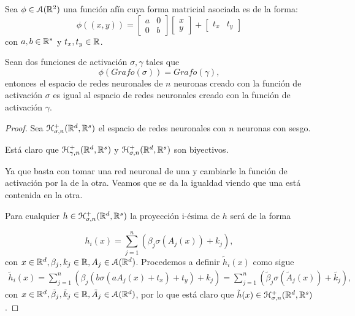 \begin{aportacionOriginal}

\begin{teorema}\label{teo:eficacia-funciones-activation}
    \label{teo:equivalencia-grafos-activation-function}
    Sea $\phi \in \mathcal{A}(\mathbb{R}^2)$ una función afín 
    cuya forma matricial asociada es de la forma:  
    \begin{equation}
        \phi((x,y)) =  
        \begin{bmatrix}
            a & 0 \\
             0& b 
        \end{bmatrix}
        \begin{bmatrix}
            x \\
            y
        \end{bmatrix}
        +
        \begin{bmatrix}
            t_x  & t_y
        \end{bmatrix}
    \end{equation}
    con $a,b \in \mathbb{R}^*$ y $t_x, t_y \in \mathbb{R}$.

    Sean dos funciones de activación $\sigma, \gamma$ tales que 
    \begin{equation*}
        \phi(Grafo(\sigma)) = Grafo(\gamma),
    \end{equation*}
    entonces 
    el espacio de redes neuronales de $n$ neuronas creado con la función de activación $\sigma$ es  
    igual al espacio de redes neuronales creado con la función de activación $\gamma$. 
\end{teorema}
\begin{proof}
    Sea $\mathcal{H}^+_{\sigma, n}(\mathbb{R}^d, \mathbb{R}^s)$ el espacio de redes neuronales con $n$ neuronas con sesgo. 

    Está claro que 
    $\mathcal{H}^+_{\gamma, n}(\mathbb{R}^d, \mathbb{R}^s)$ 
        y 
        $\mathcal{H}^+_{\sigma, n}(\mathbb{R}^d, \mathbb{R}^s)$ 
        son biyectivos.
   
    Ya que basta con tomar una red neuronal de una y cambiarle la función de activación por la de la otra. 
    Veamos 
    que se da la igualdad viendo que una está contenida en la otra. 

    Para cualquier $h  \in \mathcal{H}^+_{\sigma, n}(\mathbb{R}^d, \mathbb{R}^s)$
    la proyección i-ésima de $h$ será de la forma 

    \begin{equation*}
        h_i(x) = \sum^n_{j=1}(\beta_{j} \sigma(A_j(x))+ k_j),
    \end{equation*}
    con $x \in \mathbb{R}^d, \beta_{j}, k_j \in \mathbb{R}, A_j \in \mathcal{A}(\mathbb{R}^d)$. 
    Procedemos a definir $\tilde{h}_i(x)$ como sigue 
    \begin{align}\label{eq:h-tilda-definition}
        \tilde{h}_i(x) 
        = \sum^n_{j=1}(\beta_{j}  (b \sigma( a A_j(x) + t_x) + t_y)+ k_j)
        = \sum^n_{j=1}(\tilde{\beta}_{j} \sigma(\tilde{A}_j(x))+ \tilde{k_j}),
    \end{align}
    con $x \in \mathbb{R}^d, \tilde \beta_{j}, \tilde k_j \in \mathbb{R}, \tilde{A}_j \in \mathcal{A}(\mathbb{R}^d)$,
    por lo que está claro que $\tilde{h}(x) \in \mathcal{H}^+_{\sigma, n}(\mathbb{R}^d, \mathbb{R}^s)$. 
 

\end{proof}
\end{aportacionOriginal}
